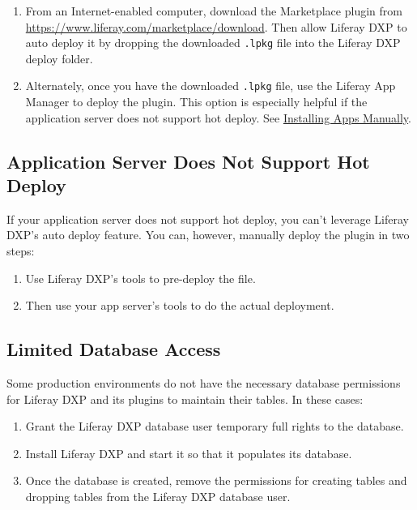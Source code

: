 \begin{enumerate}
\def\labelenumi{\arabic{enumi}.}
\item
  From an Internet-enabled computer, download the Marketplace plugin
  from \url{https://www.liferay.com/marketplace/download}. Then allow
  Liferay DXP to auto deploy it by dropping the downloaded
  \texttt{.lpkg} file into the Liferay DXP deploy folder.
\item
  Alternately, once you have the downloaded \texttt{.lpkg} file, use the
  Liferay App Manager to deploy the plugin. This option is especially
  helpful if the application server does not support hot deploy. See
  \href{/docs/7-0/user/-/knowledge_base/u/installing-apps-manually}{Installing
  Apps Manually}.
\end{enumerate}

\subsection{Application Server Does Not Support Hot
Deploy}\label{application-server-does-not-support-hot-deploy}

If your application server does not support hot deploy, you can't
leverage Liferay DXP's auto deploy feature. You can, however, manually
deploy the plugin in two steps:

\begin{enumerate}
\def\labelenumi{\arabic{enumi}.}
\item
  Use Liferay DXP's tools to pre-deploy the file.
\item
  Then use your app server's tools to do the actual deployment.
\end{enumerate}

\subsection{Limited Database Access}\label{limited-database-access}

Some production environments do not have the necessary database
permissions for Liferay DXP and its plugins to maintain their tables. In
these cases:

\begin{enumerate}
\def\labelenumi{\arabic{enumi}.}
\item
  Grant the Liferay DXP database user temporary full rights to the
  database.
\item
  Install Liferay DXP and start it so that it populates its database.
\item
  Once the database is created, remove the permissions for creating
  tables and dropping tables from the Liferay DXP database user.
\end{enumerate}

